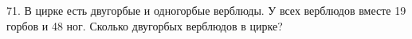 71. В цирке есть двугорбые и одногорбые верблюды. У всех верблюдов вместе 19 горбов и 48 ног. Сколько двугорбых верблюдов в цирке?\\

